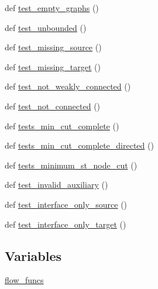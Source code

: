 \begin{DoxyCompactItemize}
\item 
def \hyperlink{namespacenetworkx_1_1algorithms_1_1connectivity_1_1tests_1_1test__cuts_a74a7ce794c568704230533325850a6c8}{test\+\_\+empty\+\_\+graphs} ()
\item 
def \hyperlink{namespacenetworkx_1_1algorithms_1_1connectivity_1_1tests_1_1test__cuts_afa7c6da2b9bb273a34bd9ebcdccee92e}{test\+\_\+unbounded} ()
\item 
def \hyperlink{namespacenetworkx_1_1algorithms_1_1connectivity_1_1tests_1_1test__cuts_aef110df2a0ab005345d6a9be955993f2}{test\+\_\+missing\+\_\+source} ()
\item 
def \hyperlink{namespacenetworkx_1_1algorithms_1_1connectivity_1_1tests_1_1test__cuts_a43ca3f6675a5556db924d6fe26ca1d28}{test\+\_\+missing\+\_\+target} ()
\item 
def \hyperlink{namespacenetworkx_1_1algorithms_1_1connectivity_1_1tests_1_1test__cuts_a6255c787bf11a9469272c4ac4bd041c6}{test\+\_\+not\+\_\+weakly\+\_\+connected} ()
\item 
def \hyperlink{namespacenetworkx_1_1algorithms_1_1connectivity_1_1tests_1_1test__cuts_a86b1db3981434d2d8680df81988c0d0b}{test\+\_\+not\+\_\+connected} ()
\item 
def \hyperlink{namespacenetworkx_1_1algorithms_1_1connectivity_1_1tests_1_1test__cuts_a71ae5678b65526b4f6de4d99165b138d}{tests\+\_\+min\+\_\+cut\+\_\+complete} ()
\item 
def \hyperlink{namespacenetworkx_1_1algorithms_1_1connectivity_1_1tests_1_1test__cuts_a392c9d2425670fd5827723a3f7c95079}{tests\+\_\+min\+\_\+cut\+\_\+complete\+\_\+directed} ()
\item 
def \hyperlink{namespacenetworkx_1_1algorithms_1_1connectivity_1_1tests_1_1test__cuts_a01821e86961b11827f26886e4c17d463}{tests\+\_\+minimum\+\_\+st\+\_\+node\+\_\+cut} ()
\item 
def \hyperlink{namespacenetworkx_1_1algorithms_1_1connectivity_1_1tests_1_1test__cuts_a461dcb345161f4f2d5babecab90c551e}{test\+\_\+invalid\+\_\+auxiliary} ()
\item 
def \hyperlink{namespacenetworkx_1_1algorithms_1_1connectivity_1_1tests_1_1test__cuts_a8e09f1fa705c83457546d26da4799487}{test\+\_\+interface\+\_\+only\+\_\+source} ()
\item 
def \hyperlink{namespacenetworkx_1_1algorithms_1_1connectivity_1_1tests_1_1test__cuts_a8ea65b71b8c1fcfcbe23bec2e2fedf3c}{test\+\_\+interface\+\_\+only\+\_\+target} ()
\end{DoxyCompactItemize}
\subsection*{Variables}
\begin{DoxyCompactItemize}
\item 
\hyperlink{namespacenetworkx_1_1algorithms_1_1connectivity_1_1tests_1_1test__cuts_a3b3028421182112f60ff142e27cea4f9}{flow\+\_\+funcs}
\end{DoxyCompactItemize}


